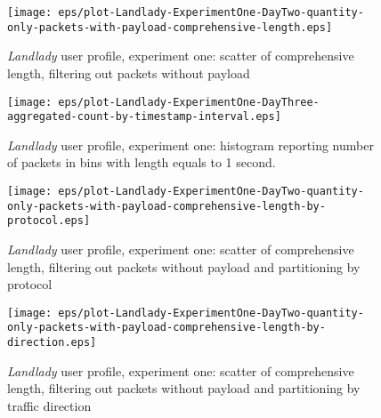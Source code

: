 \documentclass[10pt,a4paper]{article}
\begin{document}
    \begin{figure}
      \centering
      \texttt{[image: eps/plot-Landlady-ExperimentOne-DayTwo-quantity-only-packets-with-payload-comprehensive-length.eps]}
      \caption{\emph{Landlady} user profile, experiment one: scatter
        of comprehensive length, filtering out packets without
        payload}
      \label{fig:landlady-user-profile-comprehensive-length-scatter-filtering-on-payload}
    \end{figure}

    \begin{figure}
      \centering
      \texttt{[image: eps/plot-Landlady-ExperimentOne-DayThree-aggregated-count-by-timestamp-interval.eps]}
      \caption{\emph{Landlady} user profile, experiment one: histogram
        reporting number of packets in bins with length equals to 1
        second.}
      \label{fig:landlady-user-profile-exp-one-count-histogram}
    \end{figure}

    \begin{figure}
      \centering
      \texttt{[image: eps/plot-Landlady-ExperimentOne-DayTwo-quantity-only-packets-with-payload-comprehensive-length-by-protocol.eps]}
      \caption{\emph{Landlady} user profile, experiment one: scatter
        of comprehensive length, filtering out packets without payload
        and partitioning by protocol}
      \label{fig:landlady-user-profile-comprehensive-length-by-protocol}
    \end{figure}


    \begin{figure}
      \centering
      \texttt{[image: eps/plot-Landlady-ExperimentOne-DayTwo-quantity-only-packets-with-payload-comprehensive-length-by-direction.eps]}
      \caption{\emph{Landlady} user profile, experiment one: scatter
        of comprehensive length, filtering out packets without payload
        and partitioning by traffic direction}
      \label{fig:landlady-user-profile-comprehensive-length-by-direction}
    \end{figure}
\end{document}
